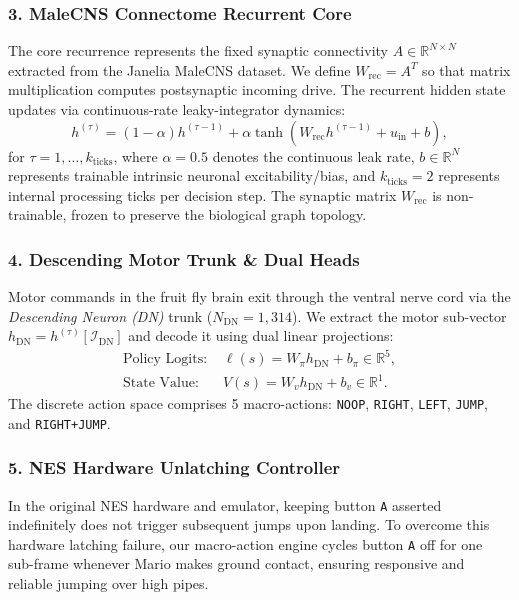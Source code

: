 \documentclass[10pt,twocolumn]{article}
\begin{document}
\subsubsection{3. MaleCNS Connectome Recurrent Core}
The core recurrence represents the fixed synaptic connectivity $A \in \mathbb{R}^{N \times N}$ extracted from the Janelia MaleCNS dataset. We define $W_{\text{rec}} = A^T$ so that matrix multiplication computes postsynaptic incoming drive. The recurrent hidden state updates via continuous-rate leaky-integrator dynamics:
\begin{equation}
    h^{(\tau)} = (1 - \alpha) h^{(\tau-1)} + \alpha \tanh\left( W_{\text{rec}} h^{(\tau-1)} + u_{\text{in}} + b \right),
    \label{eq:leaky}
\end{equation}
for $\tau = 1, \dots, k_{\text{ticks}}$, where $\alpha = 0.5$ denotes the continuous leak rate, $b \in \mathbb{R}^N$ represents trainable intrinsic neuronal excitability/bias, and $k_{\text{ticks}} = 2$ represents internal processing ticks per decision step. The synaptic matrix $W_{\text{rec}}$ is non-trainable, frozen to preserve the biological graph topology.

\subsubsection{4. Descending Motor Trunk \& Dual Heads}
Motor commands in the fruit fly brain exit through the ventral nerve cord via the \textit{Descending Neuron (DN)} trunk ($N_{\text{DN}} = 1,314$). We extract the motor sub-vector $h_{\text{DN}} = h^{(\tau)}[\mathcal{I}_{\text{DN}}]$ and decode it using dual linear projections:
\begin{align}
    \text{Policy Logits: } & \ell(s) = W_{\pi} h_{\text{DN}} + b_{\pi} \in \mathbb{R}^5, \\
    \text{State Value: } & V(s) = W_v h_{\text{DN}} + b_v \in \mathbb{R}^1.
\end{align}
The discrete action space comprises 5 macro-actions: \texttt{NOOP}, \texttt{RIGHT}, \texttt{LEFT}, \texttt{JUMP}, and \texttt{RIGHT+JUMP}.

\subsubsection{5. NES Hardware Unlatching Controller}
In the original NES hardware and emulator, keeping button \texttt{A} asserted indefinitely does not trigger subsequent jumps upon landing. To overcome this hardware latching failure, our macro-action engine cycles button \texttt{A} off for one sub-frame whenever Mario makes ground contact, ensuring responsive and reliable jumping over high pipes.
\end{document}
